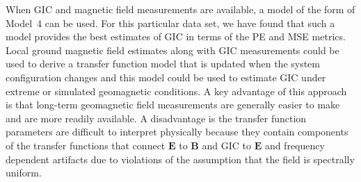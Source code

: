 \documentclass[draft,linenumbers]{agujournal2018}
\begin{document}

When GIC and magnetic field measurements are available, a model of the form of Model~4 can be used. For this particular data set, we have found that such a model provides the best estimates of GIC in terms of the PE and MSE metrics. Local ground magnetic field estimates along with GIC measurements could be used to derive a transfer function model that is updated when the system configuration changes and this model could be used to estimate GIC under extreme or simulated geomagnetic conditions. A key advantage of this approach is that long-term geomagnetic field measurements are generally easier to make and are more readily available. A disadvantage is the transfer function parameters are difficult to interpret physically because they contain components of the transfer functions that connect $\mathbf{E}$ to $\mathbf{B}$ and GIC to $\mathbf{E}$ and frequency dependent artifacts due to violations of the assumption that the field is spectrally uniform.




\end{document}
